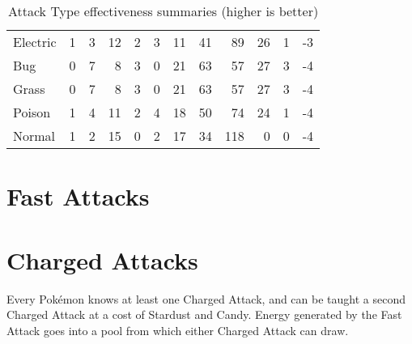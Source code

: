 \begin{table}[ht]
\begin{center}
\begin{tabular}{l r r r r r r r r r r r}
    Electric & 1 & 3 & 12 & 2 & 3 & 11 & 41 & 89 & 26 & 1 & -3 \\
    Bug & 0 & 7 & 8 & 3 & 0 & 21 & 63 & 57 & 27 & 3 & -4 \\
    Grass & 0 & 7 & 8 & 3 & 0 & 21 & 63 & 57 & 27 & 3 & -4 \\
    Poison & 1 & 4 & 11 & 2 & 4 & 18 & 50 & 74 & 24 & 1 & -4 \\
    Normal & 1 & 2 & 15 & 0 & 2 & 17 & 34 & 118 & 0 & 0 & -4 \\
\end{tabular}
    \caption[Attack Type effectiveness summaries]{Attack Type effectiveness summaries (higher is better)}
  \end{center}
\end{table}

\section{Fast Attacks}

\section{Charged Attacks}
Every Pokémon knows at least one Charged Attack, and can be taught a second
Charged Attack at a cost of Stardust and Candy. Energy generated by the Fast
Attack goes into a pool from which either Charged Attack can draw.
